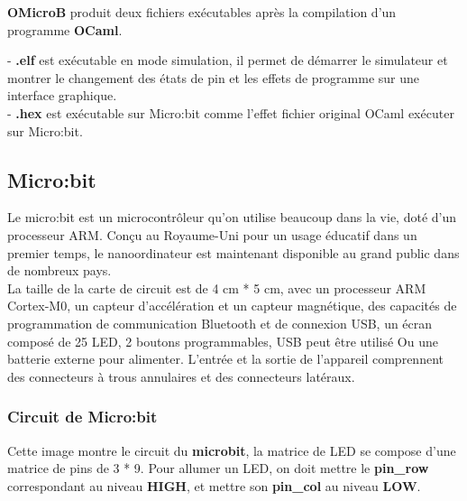 \documentclass[14px]{article}
\begin{document}
	\textbf{OMicroB} produit deux fichiers exécutables après la compilation d'un programme \textbf{OCaml}.
	
	- \textbf{.elf} est exécutable en mode simulation, il permet de démarrer le simulateur et montrer le changement des états de pin et les effets de programme sur une interface graphique.\\
	- \textbf{.hex} est exécutable sur Micro:bit comme l'effet fichier original OCaml exécuter sur Micro:bit.
	
	\subsection{Micro:bit}
	Le micro:bit est un microcontrôleur qu'on utilise beaucoup dans la vie, doté d'un processeur ARM. Conçu au Royaume-Uni pour un usage éducatif dans un premier temps, le nanoordinateur est maintenant disponible au grand public dans de nombreux pays.\\
	
	La taille de la carte de circuit est de 4 cm * 5 cm, avec un processeur ARM Cortex-M0, un capteur d'accélération et un capteur magnétique, des capacités de programmation de communication Bluetooth et de connexion USB, un écran composé de 25 LED, 2 boutons programmables, USB peut être utilisé Ou une batterie externe pour alimenter. L'entrée et la sortie de l'appareil comprennent des connecteurs à trous annulaires et des connecteurs latéraux.
	
	\subsubsection{Circuit de Micro:bit}
	Cette image montre le circuit du \textbf{microbit}, la matrice de LED se compose d'une matrice de pins de 3 * 9. Pour allumer un LED, on doit mettre le \textbf{pin\_row} correspondant au niveau \textbf{HIGH}, et mettre son \textbf{pin\_col} au niveau \textbf{LOW}.
	
	\begin{figure}
	\end{figure}
	
\end{document}
